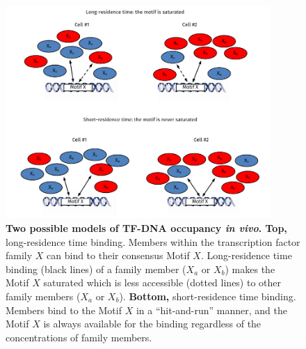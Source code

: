 \begin{figure}[!h]
    \centering
    \includegraphics[width=0.9\textwidth]{chapter4/figures/fig55.pdf}
    \caption[Two possible models of TF-DNA occupancy \textit{in vivo}]{\textbf{Two possible models of TF-DNA occupancy \textit{in vivo}. Top,} long-residence time binding. Members within the transcription factor family \textbf{$X$} can bind to their consensus Motif \textbf{$X$}. Long-residence time binding (black lines) of a family member (\textbf{$X_a$} or \textbf{$X_b$}) makes the Motif \textbf{$X$} saturated which is less accessible (dotted lines) to other family members (\textbf{$X_a$} or \textbf{$X_b$}). \textbf{Bottom,} short-residence time binding. Members bind to the Motif \textbf{$X$} in a \enquote{hit-and-run} manner, and the Motif \textbf{$X$} is always available for the binding regardless of the concentrations of family members.}
    \label{fig:fig55}
\end{figure}